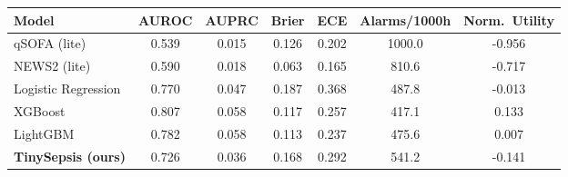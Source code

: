 \begin{tabular}{lcccccc}
\toprule
Model & AUROC & AUPRC & Brier & ECE & Alarms/1000h & Norm.\ Utility \\
\midrule
qSOFA (lite) & 0.539 & 0.015 & 0.126 & 0.202 & 1000.0 & -0.956 \\
NEWS2 (lite) & 0.590 & 0.018 & 0.063 & 0.165 & 810.6 & -0.717 \\
Logistic Regression & 0.770 & 0.047 & 0.187 & 0.368 & 487.8 & -0.013 \\
XGBoost & 0.807 & 0.058 & 0.117 & 0.257 & 417.1 & 0.133 \\
LightGBM & 0.782 & 0.058 & 0.113 & 0.237 & 475.6 & 0.007 \\
\textbf{TinySepsis (ours)} & 0.726 & 0.036 & 0.168 & 0.292 & 541.2 & -0.141 \\
\bottomrule
\end{tabular}
